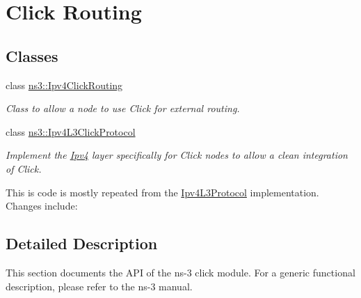 \hypertarget{group__click}{}\section{Click Routing}
\label{group__click}
\subsection*{Classes}
\begin{DoxyCompactItemize}
\item 
class \hyperlink{classns3_1_1Ipv4ClickRouting}{ns3\+::\+Ipv4\+Click\+Routing}
\begin{DoxyCompactList}\small\item\em Class to allow a node to use Click for external routing. \end{DoxyCompactList}\item 
class \hyperlink{classns3_1_1Ipv4L3ClickProtocol}{ns3\+::\+Ipv4\+L3\+Click\+Protocol}
\begin{DoxyCompactList}\small\item\em Implement the \hyperlink{classns3_1_1Ipv4}{Ipv4} layer specifically for Click nodes to allow a clean integration of Click.

This is code is mostly repeated from the \hyperlink{classns3_1_1Ipv4L3Protocol}{Ipv4\+L3\+Protocol} implementation. Changes include\+: \end{DoxyCompactList}\end{DoxyCompactItemize}


\subsection{Detailed Description}
This section documents the A\+PI of the ns-\/3 click module. For a generic functional description, please refer to the ns-\/3 manual. 